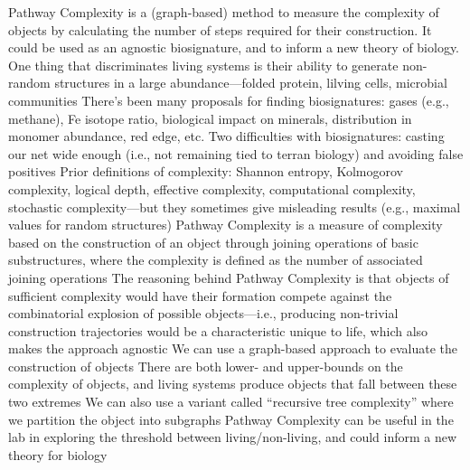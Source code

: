 \markdownRendererDocumentBegin
{} Pathway Complexity is a (graph-based) method to measure the complexity of objects by calculating the number of steps required for their construction. It could be used as an agnostic biosignature, and to inform a new theory of biology.\markdownRendererInterblockSeparator
{}\markdownRendererUlBegin
\markdownRendererUlItem One thing that discriminates living systems is their ability to generate non-random structures in a large abundance—folded protein, lilving cells, microbial communities\markdownRendererUlItemEnd 
\markdownRendererUlItem There’s been many proposals for finding biosignatures: gases (e.g., methane), Fe isotope ratio, biological impact on minerals, distribution in monomer abundance, red edge, etc.\markdownRendererUlItemEnd 
\markdownRendererUlItem Two difficulties with biosignatures: casting our net wide enough (i.e., not remaining tied to terran biology) and avoiding false positives\markdownRendererUlItemEnd 
\markdownRendererUlItem Prior definitions of complexity: Shannon entropy, Kolmogorov complexity, logical depth, effective complexity, computational complexity, stochastic complexity—but they sometimes give misleading results (e.g., maximal values for random structures)\markdownRendererUlItemEnd 
\markdownRendererUlItem Pathway Complexity is a measure of complexity based on the construction of an object through joining operations of basic substructures, where the complexity is defined as the number of associated joining operations\markdownRendererUlItemEnd 
\markdownRendererUlItem The reasoning behind Pathway Complexity is that objects of sufficient complexity would have their formation compete against the combinatorial explosion of possible objects—i.e., producing non-trivial construction trajectories would be a characteristic unique to life, which also makes the approach agnostic\markdownRendererUlItemEnd 
\markdownRendererUlItem We can use a graph-based approach to evaluate the construction of objects\markdownRendererUlItemEnd 
\markdownRendererUlItem There are both lower- and upper-bounds on the complexity of objects, and living systems produce objects that fall between these two extremes\markdownRendererUlItemEnd 
\markdownRendererUlItem We can also use a variant called “recursive tree complexity” where we partition the object into subgraphs\markdownRendererUlItemEnd 
\markdownRendererUlItem Pathway Complexity can be useful in the lab in exploring the threshold between living/non-living, and could inform a new theory for biology\markdownRendererUlItemEnd 
\markdownRendererUlEnd \markdownRendererDocumentEnd